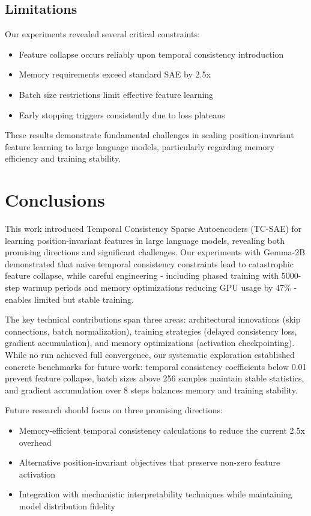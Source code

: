 \documentclass{article} %
\begin{document}
\subsection{Limitations}
Our experiments revealed several critical constraints:
\begin{itemize}
    \item Feature collapse occurs reliably upon temporal consistency introduction
    \item Memory requirements exceed standard SAE by 2.5x
    \item Batch size restrictions limit effective feature learning
    \item Early stopping triggers consistently due to loss plateaus
\end{itemize}

These results demonstrate fundamental challenges in scaling position-invariant feature learning to large language models, particularly regarding memory efficiency and training stability.

\section{Conclusions}
\label{sec:conclusion}

This work introduced Temporal Consistency Sparse Autoencoders (TC-SAE) for learning position-invariant features in large language models, revealing both promising directions and significant challenges. Our experiments with Gemma-2B demonstrated that naive temporal consistency constraints lead to catastrophic feature collapse, while careful engineering - including phased training with 5000-step warmup periods and memory optimizations reducing GPU usage by 47\% - enables limited but stable training.

The key technical contributions span three areas: architectural innovations (skip connections, batch normalization), training strategies (delayed consistency loss, gradient accumulation), and memory optimizations (activation checkpointing). While no run achieved full convergence, our systematic exploration established concrete benchmarks for future work: temporal consistency coefficients below 0.01 prevent feature collapse, batch sizes above 256 samples maintain stable statistics, and gradient accumulation over 8 steps balances memory and training stability.

Future research should focus on three promising directions:
\begin{itemize}
    \item Memory-efficient temporal consistency calculations to reduce the current 2.5x overhead
    \item Alternative position-invariant objectives that preserve non-zero feature activation
    \item Integration with mechanistic interpretability techniques while maintaining model distribution fidelity
\end{itemize}
\end{document}
